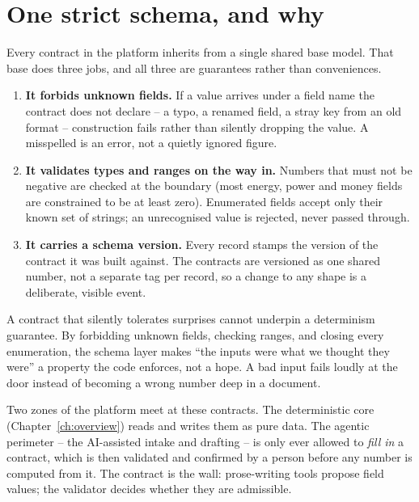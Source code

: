 \section{One strict schema, and why}

Every contract in the platform inherits from a single shared base model. That base does three jobs, and all three are guarantees rather than conveniences.

\begin{enumerate}
  \item \textbf{It forbids unknown fields.} If a value arrives under a field name the contract does not declare -- a typo, a renamed field, a stray key from an old format -- construction fails rather than silently dropping the value. A misspelled  is an error, not a quietly ignored figure.
  \item \textbf{It validates types and ranges on the way in.} Numbers that must not be negative are checked at the boundary (most energy, power and money fields are constrained to be at least zero). Enumerated fields accept only their known set of strings; an unrecognised value is rejected, never passed through.
  \item \textbf{It carries a schema version.} Every record stamps the version of the contract it was built against. The contracts are versioned as one shared number, not a separate tag per record, so a change to any shape is a deliberate, visible event.
\end{enumerate}

\begin{keyidea}
A contract that silently tolerates surprises cannot underpin a determinism guarantee. By forbidding unknown fields, checking ranges, and closing every enumeration, the schema layer makes ``the inputs were what we thought they were'' a property the code enforces, not a hope. A bad input fails loudly at the door instead of becoming a wrong number deep in a document.
\end{keyidea}

Two zones of the platform meet at these contracts. The deterministic core (Chapter~\ref{ch:overview}) reads and writes them as pure data. The agentic perimeter -- the AI-assisted intake and drafting -- is only ever allowed to \emph{fill in} a contract, which is then validated and confirmed by a person before any number is computed from it. The contract is the wall: prose-writing tools propose field values; the validator decides whether they are admissible.

